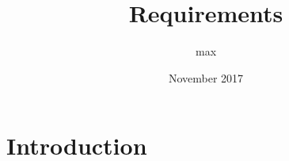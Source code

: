 \documentclass{article}
\title{Requirements}
\author{max }
\date{November 2017}
\begin{document}
\maketitle

\section{Introduction}
\end{document}
